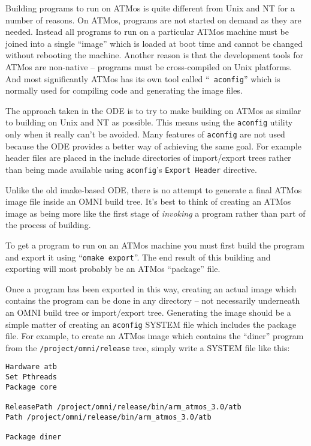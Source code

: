 \documentclass[11pt,twoside,onecolumn]{article}
\begin{document}
Building programs to run on ATMos is quite different from Unix and NT for a
number of reasons.  On ATMos, programs are not started on demand as they are
needed.  Instead all programs to run on a particular ATMos machine must be
joined into a single ``image'' which is loaded at boot time and cannot be
changed without rebooting the machine.  Another reason is that the development
tools for ATMos are non-native -- programs must be cross-compiled on Unix
platforms.  And most significantly ATMos has its own tool called ``{\tt
aconfig}'' which is normally used for compiling code and generating the image
files.

The approach taken in the ODE is to try to make building on ATMos as similar to
building on Unix and NT as possible.  This means using the {\tt aconfig}
utility only when it really can't be avoided.  Many features of {\tt aconfig}
are not used because the ODE provides a better way of achieving the same goal.
For example header files are placed in the include directories of import/export
trees rather than being made available using {\tt aconfig}'s {\tt Export
Header} directive.

Unlike the old imake-based ODE, there is no attempt to generate a final ATMos
image file inside an OMNI build tree.  It's best to think of creating an ATMos
image as being more like the first stage of {\em invoking} a program rather
than part of the process of building.

To get a program to run on an ATMos machine you must first build the program
and export it using ``{\tt omake export}''.  The end result of this building
and exporting will most probably be an ATMos ``package'' file.

\label{imageanywhere}
Once a program has been exported in this way, creating an actual image which
contains the program can be done in any directory -- not necessarily underneath
an OMNI build tree or import/export tree.  Generating the image should be
a simple matter of creating an {\tt aconfig} SYSTEM file which includes the
package file.  For example, to create an ATMos image which contains the
``diner'' program from the {\tt /project/omni/release} tree, simply write a
SYSTEM file like this:

{\footnotesize \begin{verbatim}
Hardware atb
Set Pthreads
Package core

ReleasePath /project/omni/release/bin/arm_atmos_3.0/atb
Path /project/omni/release/bin/arm_atmos_3.0/atb

Package diner
\end{verbatim}}
\end{document}
